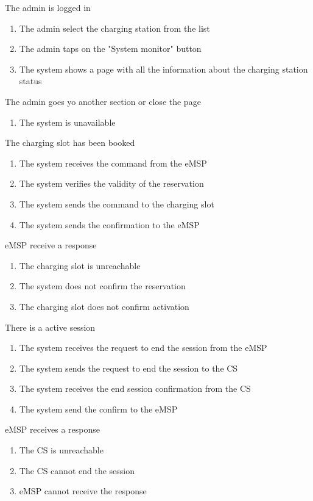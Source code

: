 \begin{enumerate}
	
	{The admin is logged in }
	{
	\begin{enumerate}[1.]
	\item The admin select the charging station from the list
	\item The admin taps on the "System monitor" button
	\item The system shows a page with all the information about the charging station status
	\end{enumerate}
	}
	{The admin goes yo another section or close the page}
	{
	\begin{enumerate}[1.]
	\item The system is unavailable
	\end{enumerate}
	}
	
	{The charging slot has been booked}
	{
	\begin{enumerate}[1.]
	\item The system receives the command from the eMSP
	\item The system verifies the validity of the reservation
	\item The system sends the command to the charging slot
	\item The system sends the confirmation to the eMSP
	\end{enumerate}
	}
	{eMSP receive a response}
	{
	\begin{enumerate}[1.]
	\item The charging slot is unreachable
	\item The system does not confirm the reservation
	\item The charging slot does not confirm activation
	\end{enumerate}
	}
	
	{There is a active session }
	{
	\begin{enumerate}[1.]
	\item The system receives the request to end the session from the eMSP
	\item The system sends the request to end the session to the CS
	\item The system receives the end session confirmation from the CS
	\item The system send the confirm to the eMSP
	\end{enumerate}
	}
	{eMSP receives a response}
	{
	\begin{enumerate}[1.]
	\item The CS is unreachable
	\item The CS cannot end the session
	\item eMSP cannot receive the response
	\end{enumerate}
	}
	

\end{enumerate}
